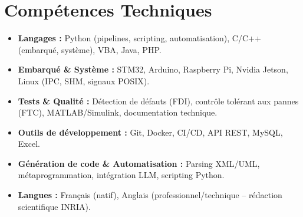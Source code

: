 \documentclass[a4paper,11pt]{article}
\begin{document}
\section{Compétences Techniques}
\begin{itemize}[leftmargin=*, nosep]
    \item \small{\textbf{Langages :} Python (pipelines, scripting, automatisation), C/C++ (embarqué, système), VBA, Java, PHP.}
    \item \small{\textbf{Embarqué \& Système :} STM32, Arduino, Raspberry Pi, Nvidia Jetson, Linux (IPC, SHM, signaux POSIX).}
    \item \small{\textbf{Tests \& Qualité :} Détection de défauts (FDI), contrôle tolérant aux pannes (FTC), MATLAB/Simulink, documentation technique.}
    \item \small{\textbf{Outils de développement :} Git, Docker, CI/CD, API REST, MySQL, Excel.}
    \item \small{\textbf{Génération de code \& Automatisation :} Parsing XML/UML, métaprogrammation, intégration LLM, scripting Python.}
    \item \small{\textbf{Langues :} Français (natif), Anglais (professionnel/technique -- rédaction scientifique INRIA).}
\end{itemize}

\end{document}
